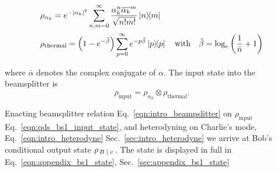 \begin{align}
&\rho_{\alpha_k} = e^{-\left|\alpha_k\right|^2} \sum_{n, m=0}^{\infty} \frac{\alpha_k^n \overline{\alpha_k}^{m}}{\sqrt{n! m!}} \dyad{n}{m} \notag \\
&\rho_{\text{thermal}} = \left(1 - e^{-\tilde{\beta}}\right) \sum_{p=0}^\infty e^{- p \tilde{\beta}}\dyad{p} \qq{with} \tilde{\beta} = \log_e\left(\frac{1}{\bar{n}} +1\right)
\end{align}

\noindent where $\bar{\alpha}$ denotes the complex conjugate of $\alpha$. The input state into the beamsplitter is
\begin{equation}\label{eqn:qds_bs1_input_state}
\rho_{\text{input}} = \rho_{\alpha_k} \otimes \rho_{\text{thermal}}.
\end{equation}

\noindent Enacting beamsplitter relation Eq.~\ref{eqn:intro_beampslitter} on $\rho_{\text{input}}$ Eq.~\ref{eqn:qds_bs1_input_state}, and heterodyning on Charlie's mode, Eq.~\ref{eqn:intro_heterodyne} Sec.~\ref{sec:intro_heterodyne} we arrive at Bob's conditional output state $\rho_{\left. B \; \middle| \; c \right.}$. The state is displayed in full in Eq.~\ref{eqn:appendix_bs1_state}, Sec.~\ref{sec:appendix_bs1_state}


